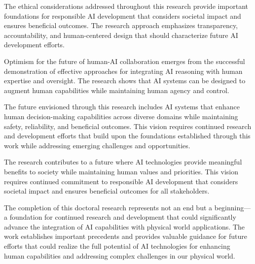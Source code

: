 The ethical considerations addressed throughout this research provide important foundations for responsible AI development that considers societal impact and ensures beneficial outcomes. The research approach emphasizes transparency, accountability, and human-centered design that should characterize future AI development efforts.

Optimism for the future of human-AI collaboration emerges from the successful demonstration of effective approaches for integrating AI reasoning with human expertise and oversight. The research shows that AI systems can be designed to augment human capabilities while maintaining human agency and control.

The future envisioned through this research includes AI systems that enhance human decision-making capabilities across diverse domains while maintaining safety, reliability, and beneficial outcomes. This vision requires continued research and development efforts that build upon the foundations established through this work while addressing emerging challenges and opportunities.

The research contributes to a future where AI technologies provide meaningful benefits to society while maintaining human values and priorities. This vision requires continued commitment to responsible AI development that considers societal impact and ensures beneficial outcomes for all stakeholders.

The completion of this doctoral research represents not an end but a beginning—a foundation for continued research and development that could significantly advance the integration of AI capabilities with physical world applications. The work establishes important precedents and provides valuable guidance for future efforts that could realize the full potential of AI technologies for enhancing human capabilities and addressing complex challenges in our physical world.

